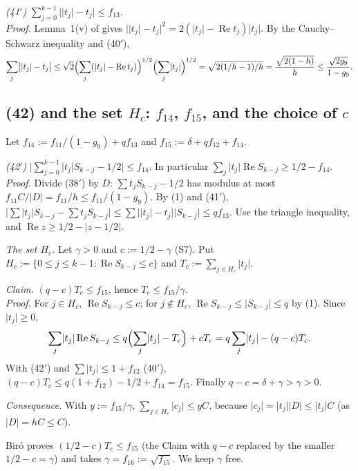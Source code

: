 \documentclass[11pt]{amsart}
\theoremstyle{remark}
\theoremstyle{plain}
\newcommand{\abs}[1]{\lvert #1\rvert}
\DeclareMathOperator{\re}{Re}
\begin{document}
\emph{(41$'$)} $\sum_{j=0}^{k-1}\bigl|\abs{t_j}-t_j\bigr|\le f_{13}$. \\
\emph{Proof.} Lemma~1(v) of \cite{Bir00b} gives $\bigl|\abs{t_j}-t_j\bigr|^2=2(\abs{t_j}-\re t_j)\abs{t_j}$. By the Cauchy--Schwarz inequality and (40$'$),
\[
\sum_j\bigl|\abs{t_j}-t_j\bigr|\le\sqrt2\Bigl(\sum_j(\abs{t_j}-\re t_j)\Bigr)^{1/2}\Bigl(\sum_j\abs{t_j}\Bigr)^{1/2}=\sqrt{2(1/h-1)/h}=\frac{\sqrt{2(1-h)}}h\le\frac{\sqrt{2g_9}}{1-g_9}.
\]

\subsection{(42) and the set \texorpdfstring{$H_c$}{Hc}: \texorpdfstring{$f_{14}$, $f_{15}$}{f14, f15}, and the choice of \texorpdfstring{$c$}{c}}\label{app:Hc}
Let $f_{14}:=f_{11}/(1-g_9)+qf_{13}$ and $f_{15}:=\delta+qf_{12}+f_{14}$.

\emph{(42$'$)} $\bigl|\sum_{j=0}^{k-1}\abs{t_j}S_{k-j}-1/2\bigr|\le f_{14}$. In particular $\sum_j\abs{t_j}\re S_{k-j}\ge1/2-f_{14}$. \\
\emph{Proof.} Divide (38$'$) by $D$: $\sum t_jS_{k-j}-1/2$ has modulus at most $f_{11}C/\abs D=f_{11}/h\le f_{11}/(1-g_9)$. By (1) and (41$'$), $\bigl|\sum\abs{t_j}S_{k-j}-\sum t_jS_{k-j}\bigr|\le\sum\bigl|\abs{t_j}-t_j\bigr|\abs{S_{k-j}}\le qf_{13}$. Use the triangle inequality, and $\re z\ge1/2-\abs{z-1/2}$.

\emph{The set $H_c$.} Let $\gamma>0$ and $c:=1/2-\gamma$ (S7). Put $H_c:=\{0\le j\le k-1:\re S_{k-j}\le c\}$ and $T_c:=\sum_{j\in H_c}\abs{t_j}$.

\emph{Claim.} $(q-c)T_c\le f_{15}$, hence $T_c\le f_{15}/\gamma$. \\
\emph{Proof.} For $j\in H_c$, $\re S_{k-j}\le c$; for $j\notin H_c$, $\re S_{k-j}\le\abs{S_{k-j}}\le q$ by (1). Since $\abs{t_j}\ge0$,
\[
\sum_j\abs{t_j}\re S_{k-j}\le q\Bigl(\sum_j\abs{t_j}-T_c\Bigr)+cT_c=q\sum_j\abs{t_j}-(q-c)T_c .
\]
With (42$'$) and $\sum\abs{t_j}\le1+f_{12}$ (40$'$), $(q-c)T_c\le q(1+f_{12})-1/2+f_{14}=f_{15}$. Finally $q-c=\delta+\gamma>\gamma>0$.

\emph{Consequence.} With $y:=f_{15}/\gamma$, $\sum_{j\in H_c}\abs{c_j}\le yC$, because $\abs{c_j}=\abs{t_j}\abs D\le\abs{t_j}C$ (as $\abs D=hC\le C$).

Bir\'o proves $(1/2-c)T_c\le f_{15}$ (the Claim with $q-c$ replaced by the smaller $1/2-c=\gamma$) and takes $\gamma=f_{16}:=\sqrt{f_{15}}$. We keep $\gamma$ free.
\end{document}
